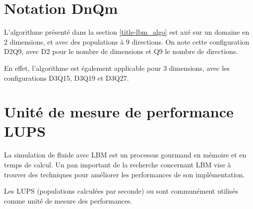 \section{Notation DnQm}
L'algorithme présenté dans la section \ref{title-lbm_algo} est axé sur un domaine en 2 dimensions, et avec des populations à 9 directions. On note cette configuration D2Q9, avec D2 pour le nombre de dimensions et Q9 le nombre de directions. 

En effet, l'algorithme est également applicable pour 3 dimensions, avec les configurations D3Q15, D3Q19 et D3Q27.

\section{Unité de mesure de performance LUPS}

La simulation de fluide avec \acs{LBM} est un processus gourmand en mémoire et en temps de calcul. Un pan important de la recherche concernant \acs{LBM} vise à trouver des techniques pour améliorer les performances de son implémentation.

Les \acl{LUPS} (populations calculées par seconde) ou \XLUPS{} sont communément utilisés comme unité de mesure des performances.